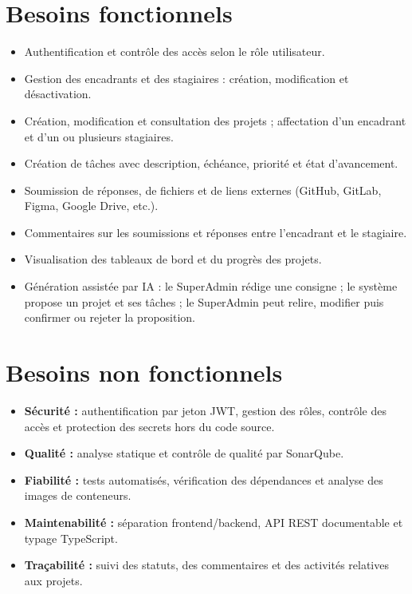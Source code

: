 \section{Besoins fonctionnels}
\begin{itemize}
  \item Authentification et contrôle des accès selon le rôle utilisateur.
  \item Gestion des encadrants et des stagiaires : création, modification et désactivation.
  \item Création, modification et consultation des projets ; affectation d'un encadrant et d'un ou plusieurs stagiaires.
  \item Création de tâches avec description, échéance, priorité et état d'avancement.
  \item Soumission de réponses, de fichiers et de liens externes (GitHub, GitLab, Figma, Google Drive, etc.).
  \item Commentaires sur les soumissions et réponses entre l'encadrant et le stagiaire.
  \item Visualisation des tableaux de bord et du progrès des projets.
  \item Génération assistée par IA : le SuperAdmin rédige une consigne ; le système propose un projet et ses tâches ; le SuperAdmin peut relire, modifier puis confirmer ou rejeter la proposition.
\end{itemize}

\section{Besoins non fonctionnels}
\begin{itemize}
  \item \textbf{Sécurité :} authentification par jeton JWT, gestion des rôles, contrôle des accès et protection des secrets hors du code source.
  \item \textbf{Qualité :} analyse statique et contrôle de qualité par SonarQube.
  \item \textbf{Fiabilité :} tests automatisés, vérification des dépendances et analyse des images de conteneurs.
  \item \textbf{Maintenabilité :} séparation frontend/backend, API REST documentable et typage TypeScript.
  \item \textbf{Traçabilité :} suivi des statuts, des commentaires et des activités relatives aux projets.
\end{itemize}

